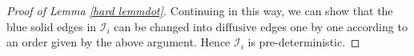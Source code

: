 \documentclass{article}
\newcommand{\1}{\mathds{1}}
\numberwithin{equation}{section}
\newcommand{\al}{\alpha}
\newcommand{\dashed}{\text{diffusive}}
\theoremstyle{plain} %
\theoremstyle{remark}
\newcommand{\Iso}{{\mathcal I}}
\begin{document}
\begin{proof}[Proof of Lemma \ref{hard lemmdot}]
Continuing in this way, we can show that the blue solid edges in $\Iso_{i}$ can be changed into $\dashed$ edges one by one according to an order given by the above argument. Hence $\Iso_{i}$ is pre-deterministic. 
\end{proof}

%
\end{document}
